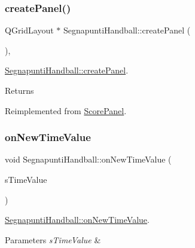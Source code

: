 \subsubsection{\texorpdfstring{create\+Panel()}{createPanel()}}
{\footnotesize\ttfamily Q\+Grid\+Layout $\ast$ Segnapunti\+Handball\+::create\+Panel (\begin{DoxyParamCaption}{ }\end{DoxyParamCaption})\hspace{0.3cm}{\ttfamily [protected]}, {\ttfamily [virtual]}}



\mbox{\hyperlink{classSegnapuntiHandball_a9ec2eff0a86fe7fad3b03a0f013af603}{Segnapunti\+Handball\+::create\+Panel}}. 

\begin{DoxyReturn}{Returns}

\end{DoxyReturn}


Reimplemented from \mbox{\hyperlink{classScorePanel_aae4f1b7b8ee1afc61ac53105f8657fdb}{Score\+Panel}}.

\mbox{\label{classSegnapuntiHandball_aba98f1f92c4eb20e1abf74d35dbefd98}} 
\subsubsection{\texorpdfstring{on\+New\+Time\+Value}{onNewTimeValue}}
{\footnotesize\ttfamily void Segnapunti\+Handball\+::on\+New\+Time\+Value (\begin{DoxyParamCaption}\item[{Q\+String}]{s\+Time\+Value }\end{DoxyParamCaption})\hspace{0.3cm}{\ttfamily [slot]}}



\mbox{\hyperlink{classSegnapuntiHandball_aba98f1f92c4eb20e1abf74d35dbefd98}{Segnapunti\+Handball\+::on\+New\+Time\+Value}}. 


\begin{DoxyParams}{Parameters}
{\em s\+Time\+Value} & \\
\hline
\end{DoxyParams}
\mbox{\label{classSegnapuntiHandball_ab5f75180cb963fdc1d19899735affde9}} 
